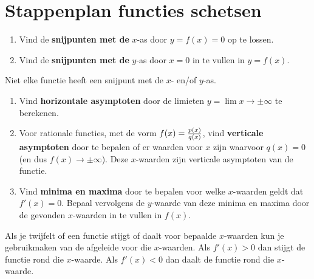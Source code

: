 \documentclass[
  a4paper,
]{scrbook}
\providecommand{\tightlist}{%
  \setlength{\itemsep}{0pt}\setlength{\parskip}{0pt}}\usepackage{longtable,booktabs,array}
\theoremstyle{definition}
\theoremstyle{remark}
\begin{document}
\section{Stappenplan functies
schetsen}\label{stappenplan-functies-schetsen}

\begin{enumerate}
\def\labelenumi{\arabic{enumi}.}
\tightlist
\item
  Vind de \textbf{snijpunten met de} \(x\)-as door \(y = f(x) = 0\) op
  te lossen.
\item
  Vind de \textbf{snijpunten met de} \(y\)-as door \(x=0\) in te vullen
  in \(y = f(x)\).
\end{enumerate}

\begin{tcolorbox}[enhanced jigsaw, rightrule=.15mm, opacityback=0, leftrule=.75mm, title=\textcolor{quarto-callout-tip-color}{\faLightbulb}\hspace{0.5em}{Tip}, toptitle=1mm, titlerule=0mm, opacitybacktitle=0.6, colframe=quarto-callout-tip-color-frame, breakable, colbacktitle=quarto-callout-tip-color!10!white, coltitle=black, toprule=.15mm, bottomrule=.15mm, left=2mm, bottomtitle=1mm, arc=.35mm, colback=white]

Niet elke functie heeft een snijpunt met de \(x\)- en/of \(y\)-as.

\end{tcolorbox}

\begin{enumerate}
\def\labelenumi{\arabic{enumi}.}
\setcounter{enumi}{2}
\tightlist
\item
  Vind \textbf{horizontale asymptoten} door de limieten
  \(y = \lim x \to \pm \infty\) te berekenen.
\item
  Voor rationale functies, met de vorm \(f(x) = {p(x) \over q(x)}\),
  vind \textbf{verticale asymptoten} door te bepalen of er waarden voor
  \(x\) zijn waarvoor \(q(x)=0\) (en dus \(f(x) \to \pm \infty\)). Deze
  \(x\)-waarden zijn verticale asymptoten van de functie.
\item
  Vind \textbf{minima en maxima} door te bepalen voor welke
  \(x\)-waarden geldt dat \(f'(x)=0\). Bepaal vervolgens de \(y\)-waarde
  van deze minima en maxima door de gevonden \(x\)-waarden in te vullen
  in \(f(x)\).
\end{enumerate}

\begin{tcolorbox}[enhanced jigsaw, rightrule=.15mm, opacityback=0, leftrule=.75mm, title=\textcolor{quarto-callout-tip-color}{\faLightbulb}\hspace{0.5em}{Tip}, toptitle=1mm, titlerule=0mm, opacitybacktitle=0.6, colframe=quarto-callout-tip-color-frame, breakable, colbacktitle=quarto-callout-tip-color!10!white, coltitle=black, toprule=.15mm, bottomrule=.15mm, left=2mm, bottomtitle=1mm, arc=.35mm, colback=white]

Als je twijfelt of een functie stijgt of daalt voor bepaalde
\(x\)-waarden kun je gebruikmaken van de afgeleide voor die
\(x\)-waarden. Als \(f'(x) > 0\) dan stijgt de functie rond die
\(x\)-waarde. Als \(f'(x) < 0\) dan daalt de functie rond die
\(x\)-waarde.

\end{tcolorbox}
\end{document}
